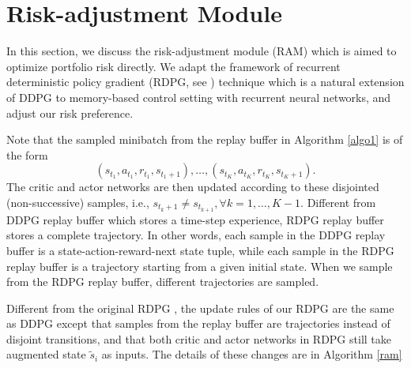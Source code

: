 \documentclass{article}
\begin{document}

\section{Risk-adjustment Module}

In this section, we discuss the risk-adjustment module (RAM) which is aimed to optimize portfolio risk directly. We adapt the framework of recurrent deterministic policy gradient (RDPG, see \cite{heess2015memory}) technique  which is a natural extension of DDPG to memory-based control setting with recurrent neural networks, and adjust our risk preference. 

Note that the sampled minibatch from the replay buffer in Algorithm \ref{algo1} is of the form
$$(s_{t_1},{a}_{t_1},r_{t_1},s_{{t_1}+1}),\dots,(s_{t_K},{a}_{t_K},r_{t_K},s_{{t_K}+1}).$$
The critic and actor networks are then updated according to these {disjointed} (non-successive) samples, i.e., $s_{t_k+1}\neq s_{t_{k+1}}, \forall k={1,\dots,K-1}$. Different from DDPG replay buffer which stores { a time-step experience}, RDPG replay buffer stores { a complete trajectory}. In other words, each sample in the DDPG replay buffer is a state-action-reward-next state tuple, while each sample in the RDPG replay buffer is a trajectory starting from a given initial state. When we sample from the RDPG replay buffer, different trajectories are sampled. 

Different from the original RDPG \cite{heess2015memory}, the update rules of our RDPG are the same as DDPG except that samples from the replay buffer are trajectories instead of disjoint transitions, and that both critic and actor networks in RDPG still take augmented state $\tilde{s}_i$ as inputs. The details of these changes are in Algorithm \ref{ram}
\end{document}
